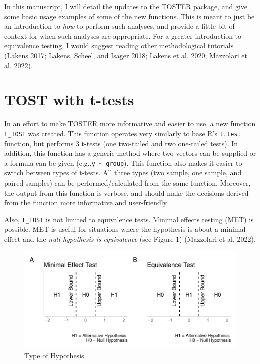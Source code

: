 \documentclass[
]{interact}
\begin{document}
In this manuscript, I will detail the updates to the TOSTER package, and
give some basic usage examples of some of the new functions. This is
meant to just be an introduction to \emph{how} to perform such analyses,
and provide a little bit of context for when such analyses are
appropriate. For a greater introduction to equivalence testing, I would
suggest reading other methodological tutorials (Lakens 2017; Lakens,
Scheel, and Isager 2018; Lakens et al. 2020; Mazzolari et al. 2022).

\hypertarget{tost-with-t-tests}{%
\section{TOST with t-tests}\label{tost-with-t-tests}}

In an effort to make TOSTER more informative and easier to use, a new
function \texttt{t\_TOST} was created. This function operates very
similarly to base R's \texttt{t.test} function, but performs 3 t-tests
(one two-tailed and two one-tailed tests). In addition, this function
has a generic method where two vectors can be supplied or a formula can
be given (e.g.,\texttt{y\ \textasciitilde{}\ group}). This function also
makes it easier to switch between types of t-tests. All three types (two
sample, one sample, and paired samples) can be performed/calculated from
the same function. Moreover, the output from this function is verbose,
and should make the decisions derived from the function more informative
and user-friendly.

Also, \texttt{t\_TOST} is not limited to equivalence tests. Minimal
effects testing (MET) is possible. MET is useful for situations where
the hypothesis is about a minimal effect and the \emph{null hypothesis
is equivalence} (see Figure 1) (Mazzolari et al. 2022).

\begin{figure}[H]

{\centering \includegraphics{avocado-quarto_files/figure-pdf/hypplot-1.pdf}

}

\caption{Type of Hypothesis}

\end{figure}
\end{document}

